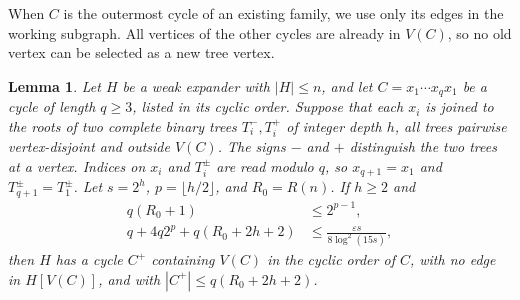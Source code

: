 \documentclass[10pt,letterpaper]{article}
\newtheorem{lemma}[theorem]{Lemma}
\theoremstyle{definition}
\theoremstyle{remark}
\newcommand{\eps}{\varepsilon}
\begin{document}
When $C$ is the outermost cycle of an existing family, we use only its edges in the working subgraph. All vertices of the other cycles are already in $V(C)$, so no old vertex can be selected as a new tree vertex.

\begin{lemma}\label{lem:wrap}
Let $H$ be a weak expander with $|H|\le n$, and let $C=x_1\cdots x_qx_1$ be a cycle of length $q\ge3$, listed in its cyclic order. Suppose that each $x_i$ is joined to the roots of two complete binary trees $T_i^-,T_i^+$ of integer depth $h$, all trees pairwise vertex-disjoint and outside $V(C)$. The signs $-$ and $+$ distinguish the two trees at a vertex. Indices on $x_i$ and $T_i^\pm$ are read modulo $q$, so $x_{q+1}=x_1$ and $T_{q+1}^\pm=T_1^\pm$. Let $s=2^h$, $p=\lfloor h/2\rfloor$, and $R_0=R(n)$. If $h\ge2$ and
\begin{align}
q(R_0+1)&\le2^{p-1},\label{eq:B1}\\
q+4q2^p+q(R_0+2h+2)&\le\frac{\eps s}{8\log^2(15s)},\label{eq:B2}
\end{align}
then $H$ has a cycle $C^+$ containing $V(C)$ in the cyclic order of $C$, with no edge in $H[V(C)]$, and with $|C^+|\le q(R_0+2h+2)$.
\end{lemma}
\end{document}
